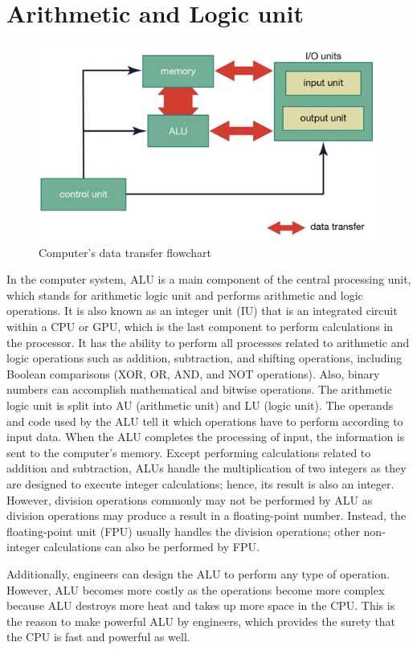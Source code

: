 \documentclass[11pt,a4paper,twoside]{article}
\begin{document}
\section{Arithmetic and Logic unit}
\begin{figure}[H]
\includegraphics[width=1\textwidth]{Fig 12.jpg}
\caption{Computer's data transfer flowchart}
\end{figure}
In the computer system, ALU is a main component of the central processing unit, which stands for arithmetic logic unit and performs arithmetic and logic operations. It is also known as an integer unit (IU) that is an integrated circuit within a CPU or GPU, which is the last component to perform calculations in the processor. It has the ability to perform all processes related to arithmetic and logic operations such as addition, subtraction, and shifting operations, including Boolean comparisons (XOR, OR, AND, and NOT operations). Also, binary numbers can accomplish mathematical and bitwise operations. The arithmetic logic unit is split into AU (arithmetic unit) and LU (logic unit). The operands and code used by the ALU tell it which operations have to perform according to input data. When the ALU completes the processing of input, the information is sent to the computer's memory.  
Except performing calculations related to addition and subtraction, ALUs handle the multiplication of two integers as they are designed to execute integer calculations; hence, its result is also an integer. However, division operations commonly may not be performed by ALU as division operations may produce a result in a floating-point number. Instead, the floating-point unit (FPU) usually handles the division operations; other non-integer calculations can also be performed by FPU.\par
Additionally, engineers can design the ALU to perform any type of operation. However, ALU becomes more costly as the operations become more complex because ALU destroys more heat and takes up more space in the CPU. This is the reason to make powerful ALU by engineers, which provides the surety that the CPU is fast and powerful as well.\par
\end{document}
